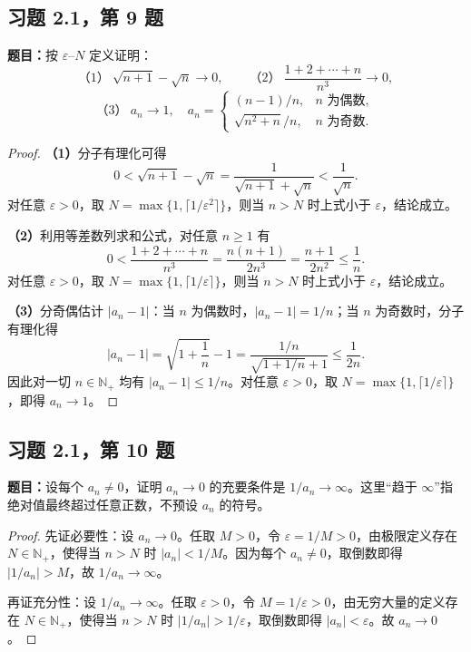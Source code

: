 \documentclass[UTF8, fontset=fandol, a4paper, 12pt]{ctexart}
\newcommand{\Nplus}{\mathbb N_{+}}
\theoremstyle{definition}
\begin{document}
\subsection{习题 2.1，第 9 题}
\noindent\textbf{题目：}按 $\varepsilon$--$N$ 定义证明：
\[
 \text{（1）}\ \sqrt{n+1}-\sqrt n\to0,\qquad
 \text{（2）}\ \frac{1+2+\cdots+n}{n^3}\to0,
\]
\[
 \text{（3）}\ a_n\to1,\quad
 a_n=\begin{cases}
 (n-1)/n,&n\text{ 为偶数},\\
 \sqrt{n^2+n}/n,&n\text{ 为奇数}.
 \end{cases}
\]
\begin{proof}
\textbf{（1）}分子有理化可得
\[
 0<\sqrt{n+1}-\sqrt n
 =\frac1{\sqrt{n+1}+\sqrt n}<\frac1{\sqrt n}.
\]
对任意 $\varepsilon>0$，取 $N=\max\{1,\lceil1/\varepsilon^2\rceil\}$，则当 $n>N$ 时上式小于 $\varepsilon$，结论成立。

\medskip
\textbf{（2）}利用等差数列求和公式，对任意 $n\ge1$ 有
\[
 0<\frac{1+2+\cdots+n}{n^3}
 =\frac{n(n+1)}{2n^3}=\frac{n+1}{2n^2}\le\frac1n.
\]
对任意 $\varepsilon>0$，取 $N=\max\{1,\lceil1/\varepsilon\rceil\}$，则当 $n>N$ 时上式小于 $\varepsilon$，结论成立。

\medskip
\textbf{（3）}分奇偶估计 $|a_n-1|$：当 $n$ 为偶数时，$|a_n-1|=1/n$；当 $n$ 为奇数时，分子有理化得
\[
 |a_n-1|=\sqrt{1+\frac1n}-1
 =\frac{1/n}{\sqrt{1+1/n}+1}\le\frac1{2n}.
\]
因此对一切 $n\in\Nplus$ 均有 $|a_n-1|\le1/n$。对任意 $\varepsilon>0$，取 $N=\max\{1,\lceil1/\varepsilon\rceil\}$，即得 $a_n\to1$。
\end{proof}

\subsection{习题 2.1，第 10 题}
\noindent\textbf{题目：}设每个 $a_n\ne0$，证明 $a_n\to0$ 的充要条件是 $1/a_n\to\infty$。这里“趋于 $\infty$”指绝对值最终超过任意正数，不预设 $a_n$ 的符号。
\begin{proof}
先证必要性：设 $a_n\to0$。任取 $M>0$，令 $\varepsilon=1/M>0$，由极限定义存在 $N\in\Nplus$，使得当 $n>N$ 时 $|a_n|<1/M$。因为每个 $a_n\ne0$，取倒数即得 $|1/a_n|>M$，故 $1/a_n\to\infty$。

再证充分性：设 $1/a_n\to\infty$。任取 $\varepsilon>0$，令 $M=1/\varepsilon>0$，由无穷大量的定义存在 $N\in\Nplus$，使得当 $n>N$ 时 $|1/a_n|>1/\varepsilon$，取倒数即得 $|a_n|<\varepsilon$。故 $a_n\to0$。
\end{proof}
\end{document}
